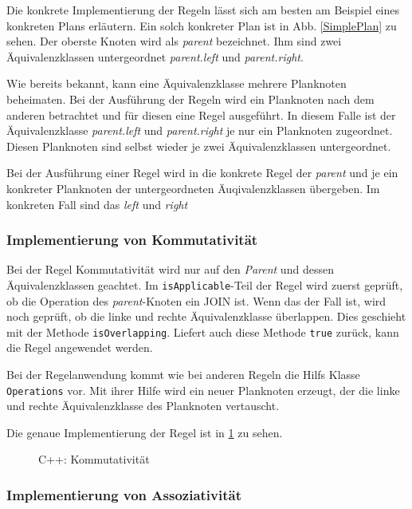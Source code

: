 Die konkrete Implementierung der Regeln lässt sich am besten am Beispiel eines konkreten Plans erläutern. Ein solch konkreter Plan ist in Abb. \ref{SimplePlan} zu sehen. Der oberste Knoten wird als \textit{parent} bezeichnet. Ihm sind zwei Äquivalenzklassen untergeordnet \textit{parent.left} und \textit{parent.right}. 

Wie bereits bekannt, kann eine Äquivalenzklasse mehrere Planknoten beheimaten. Bei der Ausführung der Regeln wird ein Planknoten nach dem anderen betrachtet und für diesen eine Regel ausgeführt. In diesem Falle ist der Äquivalenzklasse \textit{parent.left} und \textit{parent.right} je nur ein Planknoten zugeordnet. Diesen Planknoten sind selbst wieder je zwei Äquivalenzklassen untergeordnet.


Bei der Ausführung einer Regel wird in die konkrete Regel der \textit{parent} und je ein konkreter Planknoten der untergeordneten Äuqivalenzklassen übergeben. Im konkreten Fall sind das \textit{left} und \textit{right}





\subsubsection{Implementierung von Kommutativität}

Bei der Regel Kommutativität wird nur auf den \textit{Parent} und dessen Äquivalenzklassen geachtet. Im \texttt{isApplicable}-Teil der Regel wird zuerst geprüft, ob die Operation des \textit{parent}-Knoten ein JOIN ist. Wenn das der Fall ist, wird noch geprüft, ob die linke und rechte Äquivalenzklasse überlappen. Dies geschieht mit der Methode \texttt{isOverlapping}. Liefert auch diese Methode \texttt{true} zurück, kann die Regel angewendet werden.

Bei der Regelanwendung kommt wie bei anderen Regeln die Hilfs Klasse \texttt{Operations} vor. Mit ihrer Hilfe wird ein neuer Planknoten erzeugt, der die linke und rechte Äquivalenzklasse des Planknoten vertauscht.

Die genaue Implementierung der Regel ist in \ref{CommutativityCode} zu sehen.


\begin{figure}[ht]

\caption{C++: Kommutativität}
\label{CommutativityCode}
\end{figure}




\subsubsection{Implementierung von Assoziativität}

